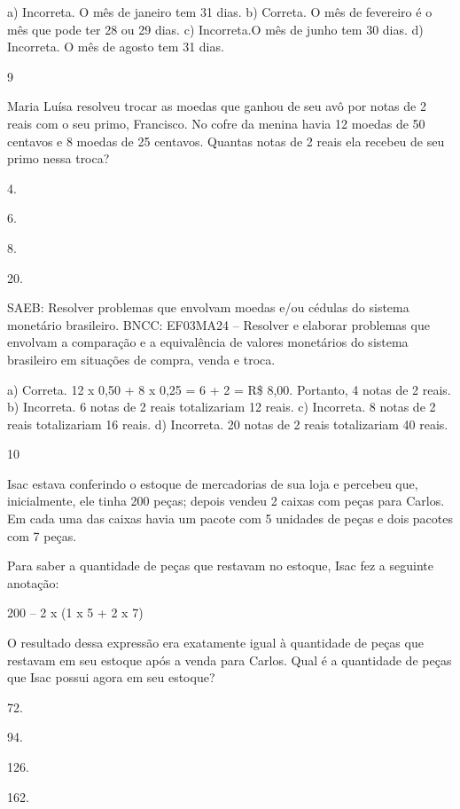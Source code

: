 {\begin{escolha}
{a) Incorreta. O mês de janeiro tem 31 dias.
b) Correta. O mês de fevereiro é o mês que pode ter 28 ou 29 dias.
c) Incorreta.O mês de junho tem 30 dias.
d) Incorreta. O mês de agosto tem 31 dias.

\num{9}

Maria Luísa resolveu trocar as moedas que ganhou de seu avô por notas de
2 reais com o seu primo, Francisco. No cofre da menina havia 12 moedas de 50
centavos e 8 moedas de 25 centavos. Quantas notas de 2 reais ela recebeu
de seu primo nessa troca?

\begin{escolha}
\item
  4.
\item
  6.
\item
  8.
\item
  20.
\end{escolha}

SAEB: Resolver problemas que envolvam moedas e/ou cédulas do sistema monetário brasileiro.
BNCC: EF03MA24 -- Resolver e elaborar problemas que envolvam a comparação e a equivalência de
valores monetários do sistema brasileiro em situações de compra, venda e troca.

a) Correta. 12 x 0,50 + 8 x 0,25 = 6 + 2 = R\$ 8,00. Portanto, 4 notas de 2 reais.
b) Incorreta. 6 notas de 2 reais totalizariam 12 reais.
c) Incorreta. 8 notas de 2 reais totalizariam 16 reais.
d) Incorreta. 20 notas de 2 reais totalizariam 40 reais.

\num{10}

Isac estava conferindo o estoque de mercadorias de sua loja e percebeu que, inicialmente, ele tinha 200 peças; depois vendeu 2 caixas com peças para Carlos. Em cada uma das caixas havia um pacote com 5 unidades de peças e dois pacotes com 7 peças.

Para saber a quantidade de peças que restavam no estoque, Isac fez a seguinte anotação:

200 -- 2 x (1 x 5 + 2 x 7)

O resultado dessa expressão era exatamente igual à quantidade de peças que restavam em seu estoque após a venda para Carlos. Qual é a quantidade de peças que Isac possui agora em seu estoque?

\begin{escolha}
\item
  72.
\item
  94.
\item
  126.
\item
  162.
\end{escolha}

}
\end{escolha}}
